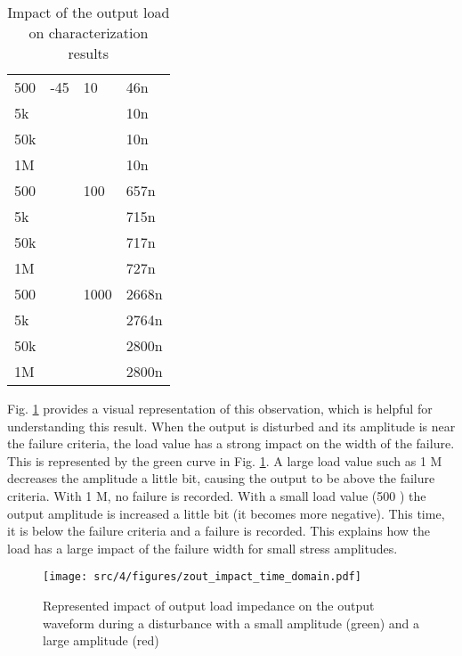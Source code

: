 \begin{table}[!p]
\begin{tabular}{llll}
500               & -45        & 10         & 46n    \\
5k                &            &            & 10n    \\
50k               &            &            & 10n    \\
1M                &            &            & 10n    \\
\rowcolor[gray]{.95}
500               &            & 100        & 657n    \\ \rowcolor[gray]{.95}
5k                &            &            & 715n    \\ \rowcolor[gray]{.95}
50k               &            &            & 717n    \\ \rowcolor[gray]{.95}
1M                &            &            & 727n    \\

500               &            & 1000       & 2668n    \\
5k                &            &            & 2764n   \\
50k               &            &            & 2800n    \\
1M                &            &            & 2800n    \\

\bottomrule
\end{tabular}
\caption{Impact of the output load on characterization results}
\label{tab:impact-load-on-cz}
\end{table}

Fig. \ref{fig:impact-time-domain-load} provides a visual representation of this observation, which is helpful for understanding this result.
When the output is disturbed and its amplitude is near the failure criteria, the load value has a strong impact on the width of the failure.
This is represented by the green curve in Fig. \ref{fig:impact-time-domain-load}.
A large load value such as 1 M\textOmega{} decreases the amplitude a little bit, causing the output to be above the failure criteria.
With 1 M\textOmega{}, no failure is recorded.
With a small load value (500 \textOmega{}) the output amplitude is increased a little bit (it becomes more negative).
This time, it is below the failure criteria and a failure is recorded.
This explains how the load has a large impact of the failure width for small stress amplitudes.

\begin{figure}[!h]
  \centering
  \texttt{[image: src/4/figures/zout\_impact\_time\_domain.pdf]}
  \caption{Represented impact of output load impedance on the output waveform during a disturbance with a small amplitude (green) and a large amplitude (red)}
  \label{fig:impact-time-domain-load}
\end{figure}

